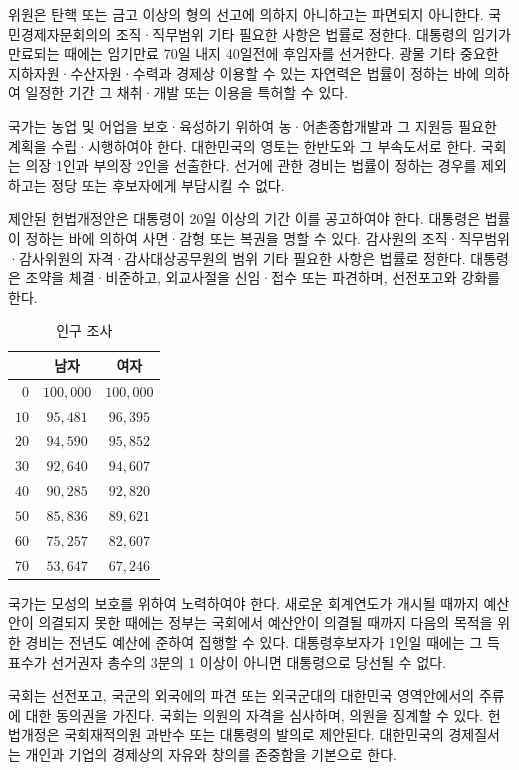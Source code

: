 \documentclass{thesis-SJ}
\begin{document}
	위원은 탄핵 또는 금고 이상의 형의 선고에 의하지 아니하고는 파면되지 아니한다. 국민경제자문회의의 조직·직무범위 기타 필요한 사항은 법률로 정한다. 대통령의 임기가 만료되는 때에는 임기만료 70일 내지 40일전에 후임자를 선거한다. 광물 기타 중요한 지하자원·수산자원·수력과 경제상 이용할 수 있는 자연력은 법률이 정하는 바에 의하여 일정한 기간 그 채취·개발 또는 이용을 특허할 수 있다.
	
	국가는 농업 및 어업을 보호·육성하기 위하여 농·어촌종합개발과 그 지원등 필요한 계획을 수립·시행하여야 한다. 대한민국의 영토는 한반도와 그 부속도서로 한다. 국회는 의장 1인과 부의장 2인을 선출한다. 선거에 관한 경비는 법률이 정하는 경우를 제외하고는 정당 또는 후보자에게 부담시킬 수 없다.
	
	제안된 헌법개정안은 대통령이 20일 이상의 기간 이를 공고하여야 한다. 대통령은 법률이 정하는 바에 의하여 사면·감형 또는 복권을 명할 수 있다. 감사원의 조직·직무범위·감사위원의 자격·감사대상공무원의 범위 기타 필요한 사항은 법률로 정한다. 대통령은 조약을 체결·비준하고, 외교사절을 신임·접수 또는 파견하며, 선전포고와 강화를 한다.
	
	\begin{table}[ht]
		\centering
		\begin{tabular}{|r||c|c|}
	\hline  & 남자 & 여자 \\ \hline\hline
	$0$ & $100,000$ & $100,000$ \\ \hline
	$10$ & $95,481$ & $96,395$ \\ \hline
	$20$ & $94,590$ & $95,852$ \\ \hline
	$30$ & $92,640$ & $94,607$ \\ \hline
	$40$ & $90,285$ & $92,820$ \\ \hline
	$50$ & $85,836$ & $89,621$ \\ \hline
	$60$ & $75,257$ & $82,607$ \\ \hline
	$70$ & $53,647$ & $67,246$ \\ \hline
	\end{tabular}

		\caption{인구 조사}\label{fig:population}
	\end{table}
	국가는 모성의 보호를 위하여 노력하여야 한다. 새로운 회계연도가 개시될 때까지 예산안이 의결되지 못한 때에는 정부는 국회에서 예산안이 의결될 때까지 다음의 목적을 위한 경비는 전년도 예산에 준하여 집행할 수 있다. 대통령후보자가 1인일 때에는 그 득표수가 선거권자 총수의 3분의 1 이상이 아니면 대통령으로 당선될 수 없다.\cite{kopka1995guide}
	
	국회는 선전포고, 국군의 외국에의 파견 또는 외국군대의 대한민국 영역안에서의 주류에 대한 동의권을 가진다. 국회는 의원의 자격을 심사하며, 의원을 징계할 수 있다. 헌법개정은 국회재적의원 과반수 또는 대통령의 발의로 제안된다. 대한민국의 경제질서는 개인과 기업의 경제상의 자유와 창의를 존중함을 기본으로 한다.
	
\end{document}
